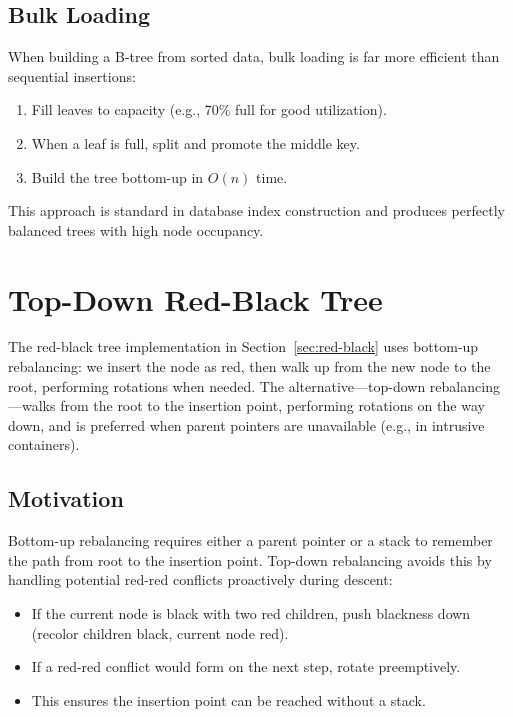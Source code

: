\subsection{Bulk Loading}
\label{sec:btree-bulk}

When building a B-tree from sorted data, bulk loading is far more efficient than sequential insertions:
\begin{enumerate}
    \item Fill leaves to capacity (e.g., 70\% full for good utilization).
    \item When a leaf is full, split and promote the middle key.
    \item Build the tree bottom-up in $O(n)$ time.
\end{enumerate}

This approach is standard in database index construction and produces perfectly balanced trees with high node occupancy.

\section{Top-Down Red-Black Tree}
\label{sec:topdown-rb}

The red-black tree implementation in Section~\ref{sec:red-black} uses bottom-up rebalancing: we insert the node as red, then walk up from the new node to the root, performing rotations when needed. The alternative---top-down rebalancing---walks from the root to the insertion point, performing rotations on the way down, and is preferred when parent pointers are unavailable (e.g., in intrusive containers).

\subsection{Motivation}
\label{sec:topdown-motivation}

Bottom-up rebalancing requires either a parent pointer or a stack to remember the path from root to the insertion point. Top-down rebalancing avoids this by handling potential red-red conflicts proactively during descent:

\begin{itemize}
    \item If the current node is black with two red children, push blackness down (recolor children black, current node red).
    \item If a red-red conflict would form on the next step, rotate preemptively.
    \item This ensures the insertion point can be reached without a stack.
\end{itemize}

